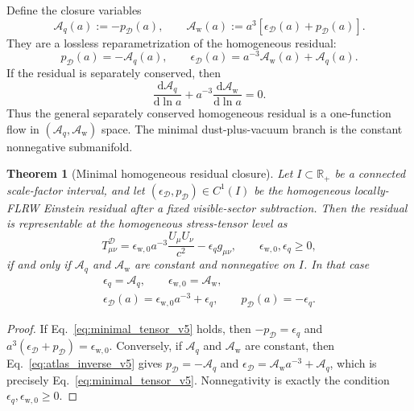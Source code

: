 \documentclass[
  aps,
  prd,
  reprint,
  superscriptaddress,
  floatfix,
  nofootinbib,
  longbibliography
]{revtex4-2}
\theoremstyle{plain}
\newtheorem{theorem}{Theorem}
\theoremstyle{definition}
\theoremstyle{remark}
\newcommand{\dd}{\mathrm d}
\newcommand{\D}{\mathcal D}
\newcommand{\wind}{\mathrm w}
\newcommand{\Aq}{\mathcal A_q}
\newcommand{\Aw}{\mathcal A_{\mathrm w}}
\newcommand{\R}{\mathbb R}
\newcommand{\eps}{\epsilon}
\begin{document}
Define the closure variables
\begin{equation}
\boxed{
\Aq(a):=-p_\D(a),
\qquad
\Aw(a):=a^3[\eps_\D(a)+p_\D(a)] .
}
\label{eq:closure_pair_v5}
\end{equation}
They are a lossless reparametrization of the homogeneous residual:
\begin{equation}
p_\D(a)=-\Aq(a),
\qquad
\eps_\D(a)=a^{-3}\Aw(a)+\Aq(a) .
\label{eq:atlas_inverse_v5}
\end{equation}
If the residual is separately conserved, then
\begin{equation}
\frac{\dd\Aq}{\dd\ln a}+a^{-3}\frac{\dd\Aw}{\dd\ln a}=0 .
\label{eq:atlas_flow_v5}
\end{equation}
Thus the general separately conserved homogeneous residual is a one-function
flow in \((\Aq,\Aw)\) space.  The minimal dust-plus-vacuum branch is the
constant nonnegative submanifold.

\begin{theorem}[Minimal homogeneous residual closure]
\label{thm:minimal_closure_v5}
Let \(I\subset\R_+\) be a connected scale-factor interval, and let
\((\eps_\D,p_\D)\in C^1(I)\) be the homogeneous locally-FLRW Einstein residual
after a fixed visible-sector subtraction.  Then the residual is representable
at the homogeneous stress-tensor level as
\begin{equation}
T^\D_{\mu\nu}
=
\eps_{\wind,0}a^{-3}\frac{U_\mu U_\nu}{c^2}
-
\eps_q g_{\mu\nu},
\qquad
\eps_{\wind,0},\eps_q\ge0,
\label{eq:minimal_tensor_v5}
\end{equation}
if and only if \(\Aq\) and \(\Aw\) are constant and nonnegative on \(I\).  In
that case
\begin{equation}
\begin{gathered}
\eps_q=\Aq,\qquad \eps_{\wind,0}=\Aw,\\
\eps_\D(a)=\eps_{\wind,0}a^{-3}+\eps_q,
\qquad
p_\D(a)=-\eps_q .
\end{gathered}
\label{eq:closure_solution_v5}
\end{equation}
\end{theorem}

\begin{proof}
If Eq.~\eqref{eq:minimal_tensor_v5} holds, then
\(-p_\D=\eps_q\) and \(a^3(\eps_\D+p_\D)=\eps_{\wind,0}\).  Conversely, if
\(\Aq\) and \(\Aw\) are constant, then Eq.~\eqref{eq:atlas_inverse_v5} gives
\(p_\D=-\Aq\) and \(\eps_\D=\Aw a^{-3}+\Aq\), which is precisely
Eq.~\eqref{eq:minimal_tensor_v5}.  Nonnegativity is exactly the condition
\(\eps_q,\eps_{\wind,0}\ge0\).
\end{proof}
\end{document}
